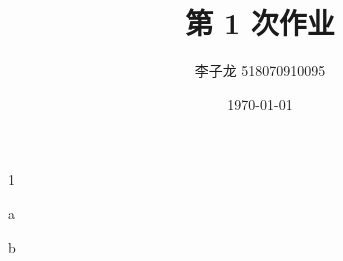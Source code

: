 \documentclass[12pt,a4paper]{article}
\newenvironment{problems}{\begin{list}{}{\renewcommand{\makelabel}[1]{\textbf{##1}.\hfil}}}{\end{list}}
\newenvironment{steps}{\begin{list}{}{\renewcommand{\makelabel}[1]{##1.\hfil}}}{\end{list}}
\begin{document}
\title{第 1 次作业}
\author{李子龙 518070910095}
\date{\today}
\maketitle

\begin{problems}
    \item[1]
    \begin{steps}
        \item[a]
        \item[b] 
    \end{steps}
\end{problems}
\end{document}
